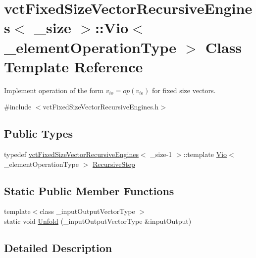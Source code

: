 \hypertarget{classvct_fixed_size_vector_recursive_engines_1_1_vio}{}\section{vct\+Fixed\+Size\+Vector\+Recursive\+Engines$<$ \+\_\+size $>$\+:\+:Vio$<$ \+\_\+element\+Operation\+Type $>$ Class Template Reference}
\label{classvct_fixed_size_vector_recursive_engines_1_1_vio}


Implement operation of the form $v_{io} = op(v_{io})$ for fixed size vectors.  




{\ttfamily \#include $<$vct\+Fixed\+Size\+Vector\+Recursive\+Engines.\+h$>$}

\subsection*{Public Types}
\begin{DoxyCompactItemize}
\item 
typedef \hyperlink{classvct_fixed_size_vector_recursive_engines}{vct\+Fixed\+Size\+Vector\+Recursive\+Engines}$<$ \+\_\+size-\/1 $>$\+::template \hyperlink{classvct_fixed_size_vector_recursive_engines_1_1_vio}{Vio}$<$ \+\_\+element\+Operation\+Type $>$ \hyperlink{classvct_fixed_size_vector_recursive_engines_1_1_vio_ab8636d835afe64d6831799cc7ce45d27}{Recursive\+Step}
\end{DoxyCompactItemize}
\subsection*{Static Public Member Functions}
\begin{DoxyCompactItemize}
\item 
{\footnotesize template$<$class \+\_\+input\+Output\+Vector\+Type $>$ }\\static void \hyperlink{classvct_fixed_size_vector_recursive_engines_1_1_vio_a09db66b4c82e88ceb27fcec9cd0f9589}{Unfold} (\+\_\+input\+Output\+Vector\+Type \&input\+Output)
\end{DoxyCompactItemize}


\subsection{Detailed Description}
